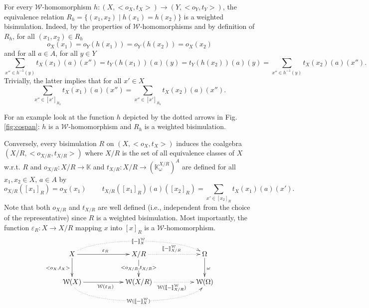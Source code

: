 \documentclass[3p]{elsarticle}
\newcommand{\cbox}[1]{\vspace{0.2cm}\noindent
  \fbox{\parbox{.97\textwidth}{#1}}\vspace{0.2cm}}
\newcommand{\fW}{\mathcal{W}}    %
\newcommand{\setproduct}{\times} %
\newcommand{\beh}[3]{\left[\!\left[ #1 \right]\!\right]^{#2}_{#3}} %
\newcommand{\comp}{\circ}               %
\newcommand{\K}{\mathbb{K}}            %
\begin{document}
%
%
%



For every $\fW$-homomorphism $h\colon (X, <o_X,t_X>) \to (Y,
<o_Y,t_Y>)$, the equivalence relation $R_h=\{(x_1,x_2) \;|\;
h(x_1)=h(x_2)\}$ is a weighted bisimulation. Indeed, by the
properties of $\fW$-homomorphisms and by definition of $R_h$, for
all $(x_1,x_2) \in R_h$
\[o_X(x_1)=o_Y(h(x_1))=o_Y(h(x_2))=o_X(x_2)\] and for all $ a \in A$, for all $ y \in Y$
%
\[\sum_{x''\in
h^{-1}(y)}t_X(x_1)(a)(x'')=t_Y(h(x_1))(a)(y)=t_Y(h(x_2))(a)(y)=\sum_{x''\in
h^{-1}(y)}t_X(x_2)(a)(x'')\text{.} \] Trivially, the latter implies
that for all $ x' \in X$
\[\sum_{x''\in [x']_{R_h}}t_X(x_1)(a)(x'')=\sum_{x'' \in [x']_{R_h}}t_X(x_2)(a)(x'')\text{.} \]

For an example look at the function $h$ depicted by the dotted
arrows in Fig. \ref{fig:cospan}: $h$ is a $\fW$-homomorphism and
$R_h$ is a weighted bisimulation.

Conversely, every bisimulation $R$ on $(X, <o_X,t_X>)$ induces the
coalgebra $(X/R, <o_{X/R},t_{X/R}>)$ where $X/R$ is the set of all
equivalence classes of $X$ w.r.t. $R$ and $o_{X/R}\colon X/R \to \K$
and $t_{X/R}\colon X/R \to (\K^{X/R}_{\omega})^A$ are defined for
all $x_1,x_2\in X$, $a\in A$ by
\[o_{X/R}([x_1]_R)=
o_X(x_1) %
\;\;\;\;\;\;\;\; t_{X/R}([x_1]_R)(a)([x_2]_R)=\sum_{x'\in
[x_2]_R}t_X(x_1)(a)(x')\text{.}\]
Note that both $o_{X/R}$ and $t_{X/R}$ are well defined (i.e.,
independent from the choice of the representative) since $R$ is a
weighted bisimulation. Most importantly, the function
$\varepsilon_R\colon  X \to X/R$ mapping $x$ into $[x]_R$ is a
$\fW$-homomorphism.
\[
\xymatrix@C=2cm{X \ar[d]_{<o_X,t_X>} \ar@{.>}@(ur,ul)[rr]|{\beh{-}{\fW}{X}} \ar[r]^{\varepsilon_R}& X/R\ar[d]|{<o_{X/R},t_{X/R}>} \ar@{.>}[r]^{\beh{-}{\fW}{X/R}} & \Omega \ar[d]^{\omega}\\
\fW(X) \ar@{.>}@(d,d)[rr]|{\fW(\beh{-}{\fW}{X})}
\ar[r]_{\fW(\varepsilon_R)}& \fW(X/R)
\ar@{.>}[r]_{\fW(\beh{-}{\fW}{X/R})}& \fW(\Omega)}
\]
\end{document}
